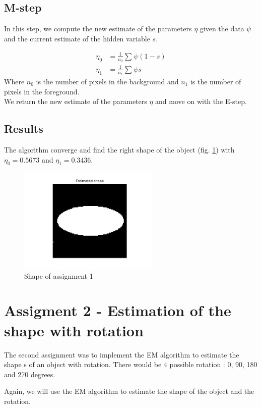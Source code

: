 \documentclass{article}
\begin{document}
\subsection*{M-step}
In this step, we compute the new estimate of the parameters $\eta$ given the data $\psi$ and the current estimate of the hidden variable $s$.

\begin{align*}
    \eta_0 &= \frac{1}{n_0} \sum_{} \psi (1 - s) \\
    \eta_1 &= \frac{1}{n_1} \sum_{} \psi s
\end{align*}
Where $n_0$ is the number of pixels in the background and $n_1$ is the number of pixels in the foreground. \\
We return the new estimate of the parameters $\eta$ and move on with the E-step.
\newpage

\subsection*{Results}
The algorithm converge and find the right shape of the object (fig. \ref{fig:shape1}) with $\eta_0 = 0.5673$ and $\eta_1 = 0.3436$.

\begin{figure}[h]
    \centering
    \includegraphics[width=0.6\textwidth]{images/shape1.png}
    \caption{Shape of assignment 1}
    \label{fig:shape1}
\end{figure}


\section{Assigment 2 - Estimation of the shape with rotation}

The second assignment was to implement the EM algorithm to estimate the shape s of an object with rotation.
There would be 4 possible rotation : 0, 90, 180 and 270 degrees.

Again, we will use the EM algorithm to estimate the shape of the object and the rotation.
\end{document}
